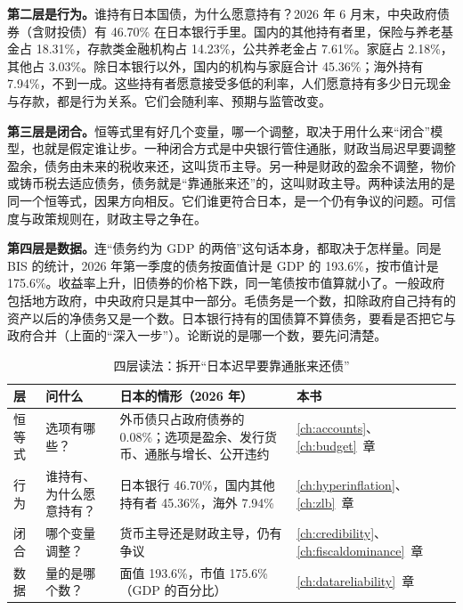 \textbf{第二层是行为。}谁持有日本国债，为什么愿意持有？2026 年 6 月末，中央政府债券（含财投债）有 46.70\% 在日本银行手里。国内的其他持有者里，保险与养老基金占 18.31\%，存款类金融机构占 14.23\%，公共养老金占 7.61\%。家庭占 2.18\%，其他占 3.03\%。除日本银行以外，国内的机构与家庭合计 45.36\%；海外持有 7.94\%，不到一成\cite{boj2026ff}。这些持有者愿意接受多低的利率，人们愿意持有多少日元现金与存款，都是行为关系。它们会随利率、预期与监管改变。

\textbf{第三层是闭合。}恒等式里有好几个变量，哪一个调整，取决于用什么来“闭合”模型，也就是假定谁让步。一种闭合方式是中央银行管住通胀，财政当局迟早要调整盈余，债务由未来的税收来还，这叫货币主导。另一种是财政的盈余不调整，物价或铸币税去适应债务，债务就是“靠通胀来还”的，这叫财政主导。两种读法用的是同一个恒等式，因果方向相反。它们谁更符合日本，是一个仍有争议的问题。可信度与政策规则在，财政主导之争在。

\textbf{第四层是数据。}连“债务约为 GDP 的两倍”这句话本身，都取决于怎样量。同是 BIS 的统计，2026 年第一季度的债务按面值计是 GDP 的 193.6\%，按市值计是 175.6\%\cite{bis2026}。收益率上升，旧债券的价格下跌，同一笔债按市值算就小了。一般政府包括地方政府，中央政府只是其中一部分。毛债务是一个数，扣除政府自己持有的资产以后的净债务又是一个数。日本银行持有的国债算不算债务，要看是否把它与政府合并（上面的“深入一步”）。论断说的是哪一个数，要先问清楚。

\begin{table}[htbp]\centering\small
\caption{四层读法：拆开“日本迟早要靠通胀来还债”}\label{tab:intro-layers}
\begin{tabularx}{\linewidth}{@{}l Y Y l@{}}
\toprule
层 & 问什么 & 日本的情形（2026 年） & 本书 \\\midrule
恒等式 & 选项有哪些？ & 外币债只占政府债券的 0.08\%；选项是盈余、发行货币、通胀与增长、公开违约 & \ref{ch:accounts}、\ref{ch:budget}~章 \\
行为 & 谁持有、为什么愿意持有？ & 日本银行 46.70\%，国内其他持有者 45.36\%，海外 7.94\% & \ref{ch:hyperinflation}、\ref{ch:zlb}~章 \\
闭合 & 哪个变量调整？ & 货币主导还是财政主导，仍有争议 & \ref{ch:credibility}、\ref{ch:fiscaldominance}~章 \\
数据 & 量的是哪个数？ & 面值 193.6\%，市值 175.6\%（GDP 的百分比） & \ref{ch:datareliability}~章 \\
\bottomrule
\end{tabularx}
\end{table}

